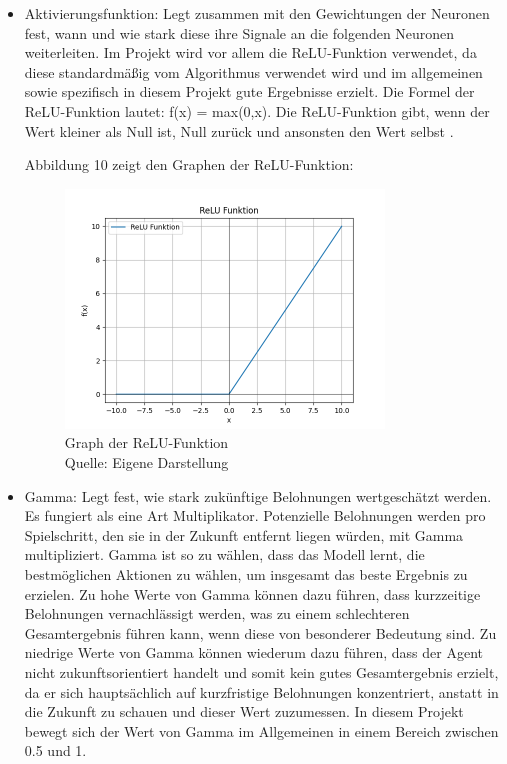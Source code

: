 \begin{itemize}
\item Aktivierungsfunktion: Legt zusammen mit den Gewichtungen der Neuronen fest, wann und wie stark diese ihre Signale an die folgenden Neuronen weiterleiten. Im Projekt wird vor allem die ReLU-Funktion verwendet, da diese standardmäßig vom Algorithmus verwendet wird und im allgemeinen sowie spezifisch in diesem Projekt gute Ergebnisse erzielt. Die Formel der ReLU-Funktion lautet: f(x) = max(0,x). Die ReLU-Funktion gibt, wenn der Wert kleiner als Null ist, Null zurück und ansonsten den Wert selbst \cite{schmidt-hieber_nonparametric_2020}.

Abbildung 10 zeigt den Graphen der ReLU-Funktion:
\nopagebreak
\begin{figure}[H]
	\includegraphics[width=0.8\textwidth]{Bilder/ReLU} 
	\caption[Graph der ReLU-Funktion]{Graph der ReLU-Funktion\\ Quelle: Eigene Darstellung}
\end{figure}

\item Gamma: Legt fest, wie stark zukünftige Belohnungen wertgeschätzt werden. Es fungiert als eine Art Multiplikator. Potenzielle Belohnungen werden pro Spielschritt, den sie in der Zukunft entfernt liegen würden, mit Gamma multipliziert. Gamma ist so zu wählen, dass das Modell lernt, die bestmöglichen Aktionen zu wählen, um insgesamt das beste Ergebnis zu erzielen. Zu hohe Werte von Gamma können dazu führen, dass kurzzeitige Belohnungen vernachlässigt werden, was zu einem schlechteren Gesamtergebnis führen kann, wenn diese von besonderer Bedeutung sind. Zu niedrige Werte von Gamma können wiederum dazu führen, dass der Agent nicht zukunftsorientiert handelt und somit kein gutes Gesamtergebnis erzielt, da er sich hauptsächlich auf kurzfristige Belohnungen konzentriert, anstatt in die Zukunft zu schauen und dieser Wert zuzumessen. In diesem Projekt bewegt sich der Wert von Gamma im Allgemeinen in einem Bereich zwischen 0.5 und 1.


\end{itemize}
